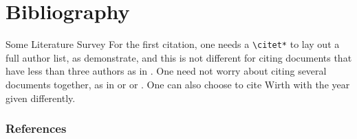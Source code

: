 \documentclass[usenames,dvipsnames,notes]{beamer}
\begin{document}
\section{Bibliography}
\begin{frame}{Some Literature Survey} For the first citation, one needs a \texttt{\textbackslash citet*} to lay out a full author list, as \citet*{annie1} demonstrate, and this is not different for citing documents that have less than three authors as in \citet{shildesthesis}. One need not worry about citing several documents together, as in \citet{madhsardthesis,mcderm} or \citep{sinhala1,sinhala2} or \citealp{sampson1,sampson2}. One can also choose to cite Wirth\citeyearpar{wirth} with the year given differently.
    
\end{frame}
\begin{frame}[allowframebreaks]
	\frametitle{References}
	
	
\end{frame}
\end{document}
